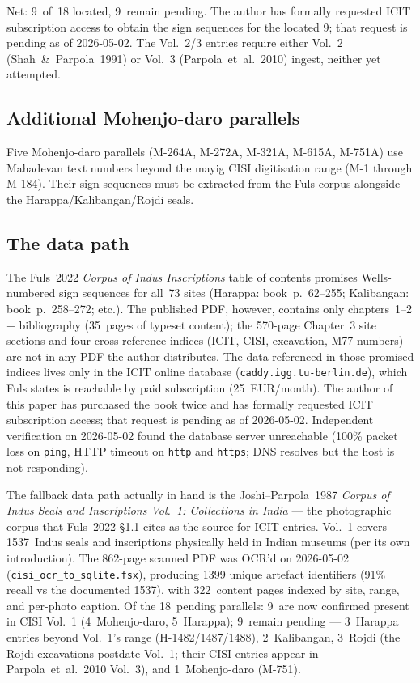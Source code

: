 \noindent
Net: 9~of~18 located, 9~remain pending. The author has formally
requested ICIT subscription access to obtain the sign sequences
for the located 9; that request is pending as of 2026-05-02.
The Vol.~2/3 entries require either Vol.~2 (Shah~\&~Parpola~1991)
or Vol.~3 (Parpola~et~al.~2010) ingest, neither yet attempted.

\subsection{Additional Mohenjo-daro parallels}

Five Mohenjo-daro parallels (M-264A, M-272A, M-321A, M-615A,
M-751A) use Mahadevan text numbers beyond the mayig CISI
digitisation range (M-1 through M-184). Their sign sequences
must be extracted from the Fuls corpus alongside the
Harappa/Kalibangan/Rojdi seals.

\subsection{The data path}

The Fuls~2022 \textit{Corpus of Indus
Inscriptions}\smartcite{Fuls2022} table of contents promises
Wells-numbered sign sequences for all~73 sites
(Harappa: book~p.~62--255; Kalibangan:
book~p.~258--272; etc.). The published PDF, however, contains
only chapters~1--2 + bibliography (35~pages of typeset content);
the 570-page Chapter~3 site sections and four cross-reference
indices (ICIT, CISI, excavation, M77 numbers) are not in any
PDF the author distributes. The data referenced in those promised
indices lives only in the ICIT online database
(\texttt{caddy.igg.tu-berlin.de})\smartcite{WellsFuls2006},
which Fuls states is reachable by paid subscription
(25~EUR/month). The author of this paper has purchased the book
twice and has formally requested ICIT subscription access; that
request is pending as of 2026-05-02. Independent verification on
2026-05-02 found the database server unreachable
(100\% packet loss on \texttt{ping}, HTTP timeout on
\texttt{http} and \texttt{https}; DNS resolves but the host is
not responding).

The fallback data path actually in hand is the Joshi--Parpola~1987
\textit{Corpus of Indus Seals and Inscriptions Vol.~1: Collections
in India}\smartcite{JoshiParpola1987} --- the photographic
corpus that Fuls~2022 \S1.1 cites as the source for ICIT entries.
Vol.~1 covers 1537~Indus seals and inscriptions physically held in
Indian museums (per its own introduction). The 862-page scanned
PDF was OCR'd on 2026-05-02 (\texttt{cisi\_ocr\_to\_sqlite.fsx}),
producing \num{1399} unique artefact identifiers (91\% recall vs
the documented 1537), with 322~content pages indexed by site,
range, and per-photo caption. Of the 18~pending parallels:
9~are now confirmed present in CISI Vol.~1 (4~Mohenjo-daro,
5~Harappa); 9~remain pending --- 3~Harappa entries beyond Vol.~1's
range (H-1482/1487/1488), 2~Kalibangan, 3~Rojdi (the Rojdi
excavations postdate Vol.~1; their CISI entries appear in
Parpola~et~al.~2010 Vol.~3), and 1~Mohenjo-daro
(M-751).

